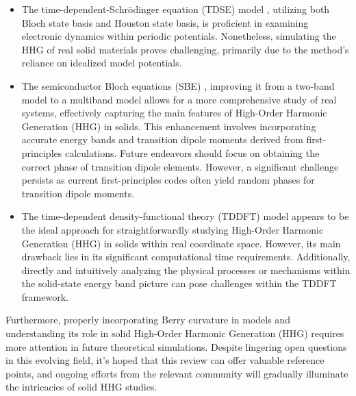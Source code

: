 \begin{itemize}
	\item The time-dependent-Schr\"odinger equation (\gls{TDSE}) model \cite{wu2015high, wu2017orientation, plaja1992high, hawkins2015effect, ndabashimiye2016solid, wu2016multilevel, guan2016high, jin2018high, du2018high}, utilizing both Bloch state basis and Houston state basis, is proficient in examining electronic dynamics within periodic potentials. Nonetheless, simulating the HHG of real solid materials proves challenging, primarily due to the method's reliance on idealized model potentials.
	\item The semiconductor Bloch equations (\gls{SBE}) \cite{hohenleutner2015real, schubert2014sub, langer2016lightwave, vampa2014theoretical, mcdonald2017enhancing, yu2018two, luu2016high, golde2008high, jiang2018role, vampa2015semiclassical, tamaya2016diabatic}, improving it from a two-band model to a multiband model allows for a more comprehensive study of real systems, effectively capturing the main features of High-Order Harmonic Generation (HHG) in solids. This enhancement involves incorporating accurate energy bands and transition dipole moments derived from first-principles calculations. Future endeavors should focus on obtaining the correct phase of transition dipole elements. However, a significant challenge persists as current first-principles codes often yield random phases for transition dipole moments.
	\item The time-dependent density-functional theory (\gls{TDDFT}) model \cite{tancogne2017impact, tancogne2018ultrafast, tancogne2017ellipticity, hansen2017high, meng2018real, floss2018ab, bauer2018high} appears to be the ideal approach for straightforwardly studying High-Order Harmonic Generation (HHG) in solids within real coordinate space. However, its main drawback lies in its significant computational time requirements. Additionally, directly and intuitively analyzing the physical processes or mechanisms within the solid-state energy band picture can pose challenges within the TDDFT framework.
\end{itemize}
Furthermore, properly incorporating Berry curvature in models and understanding its role in solid High-Order Harmonic Generation (HHG) requires more attention in future theoretical simulations. Despite lingering open questions in this evolving field, it's hoped that this review can offer valuable reference points, and ongoing efforts from the relevant community will gradually illuminate the intricacies of solid HHG studies.
